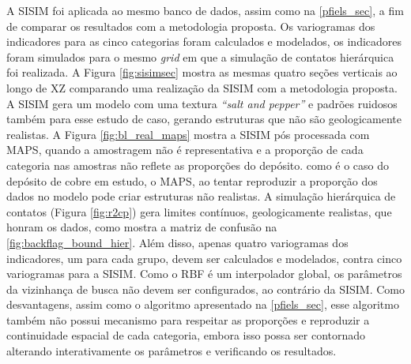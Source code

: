 A SISIM foi aplicada ao mesmo banco de dados, assim como na \autoref{pfiels_sec}, a fim de comparar os resultados com a metodologia proposta. Os variogramas dos indicadores para as cinco categorias foram calculados e modelados, os indicadores foram simulados para o mesmo \textit{grid} em que a simulação de contatos hierárquica foi realizada. A Figura \autoref{fig:sisimsec} mostra as mesmas quatro seções verticais ao longo de XZ comparando uma realização da SISIM com a metodologia proposta. A SISIM gera um modelo com uma textura \textit{“salt and pepper”} e padrões ruidosos também para esse estudo de caso, gerando estruturas que não são geologicamente realistas. A Figura \autoref{fig:bl_real_maps} mostra a SISIM pós processada com MAPS, quando a amostragem não é representativa e a proporção de cada categoria nas amostras não reflete as proporções do depósito. como é o caso do depósito de cobre em estudo, o MAPS, ao tentar reproduzir a proporção dos dados no modelo pode criar estruturas não realistas. A simulação hierárquica de contatos (Figura \autoref{fig:r2cp}) gera limites contínuos, geologicamente realistas, que honram os dados, como mostra a matriz de confusão na \autoref{fig:backflag_bound_hier}. Além disso, apenas quatro variogramas dos indicadores, um para cada grupo, devem ser calculados e modelados, contra cinco variogramas para a SISIM. Como o RBF é um interpolador global, os parâmetros da vizinhança de busca não devem ser configurados, ao contrário da SISIM. Como desvantagens, assim como o algoritmo apresentado na \autoref{pfiels_sec}, esse algoritmo também não possui mecanismo para respeitar as proporções e reproduzir a continuidade espacial de cada categoria, embora isso possa ser contornado alterando interativamente os parâmetros e verificando os resultados.

